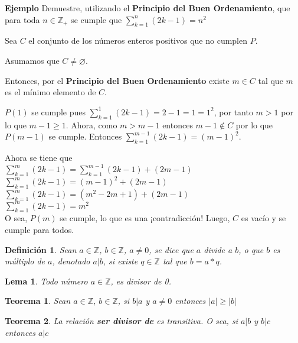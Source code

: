 \documentclass[a4paper,1pt]{report}
\newtheorem*{teo}{Teorema}
\newtheorem*{dfn}{Definición}
\newtheorem*{lem}{Lema}
\begin{document}


\textbf{Ejemplo}
Demuestre, utilizando el \textbf{Principio del Buen Ordenamiento}, que para toda $n\in\mathbb{Z}_{+}$ se cumple que $\sum^n_{k=1}(2k-1)=n^2$

Sea $C$ el conjunto de los números enteros positivos que no cumplen $P$. 

Asumamos que $C\neq \varnothing$.

Entonces, por el \textbf{Principio del Buen Ordenamiento} existe $m\in C$ tal que $m$ es el mínimo elemento de $C$.

$P(1)$ se cumple pues $\sum^1_{k=1}(2k-1)=2-1=1=1^2$, por tanto $m>1$ por lo que $m-1\geq1$. Ahora, como $m > m-1$ entonces $m-1\notin C$ por lo que $P(m-1)$ se cumple. Entonces $\sum^{m-1}_{k=1}(2k-1)=(m-1)^2$.

Ahora se tiene que\\ 
$\sum^m_{k=1}(2k-1)=\sum^{m-1}_{k=1}(2k-1)+(2m-1)$\\
$\sum^m_{k=1}(2k-1)=(m-1)^2+(2m-1)$\\
$\sum^m_{k=1}(2k-1)=(m^2-2m+1)+(2m-1)$\\
$\sum^m_{k=1}(2k-1)=m^2$\\
O sea, $P(m)$ se cumple, lo que es una ¡contradicción! Luego, $C$ es vacío y se cumple para todos.

\begin{dfn}
 Sean $a\in\mathbb{Z}$, $b\in\mathbb{Z}$, $a\neq 0$, se dice que $a$ divide a $b$, o que $b$ es múltiplo de $a$, denotado $a|b$, si existe $q\in\mathbb{Z}$ tal que $b=a*q$.
\end{dfn}

\begin{lem}
 Todo número $a\in\mathbb{Z}$, es divisor de 0.
\end{lem}

\begin{teo}
 Sean $a\in\mathbb{Z}$, $b\in\mathbb{Z}$, si $b|a$ y $a\neq 0$ entonces $|a| \geq |b|$
\end{teo}

\begin{teo}
 La relación \textbf{ser divisor de} es transitiva. O sea, si $a|b$ y $b|c$ entonces $a|c$
\end{teo}
\end{document}
